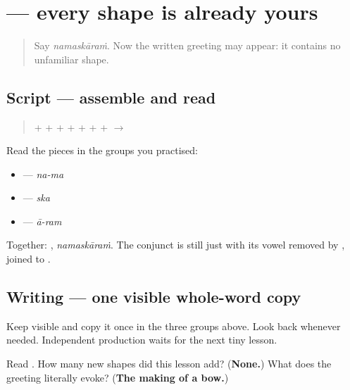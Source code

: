 \section[\texorpdfstring{\ml{നമസ്കാരം} (namaskāraṁ)}{നമസ്കാരം (namaskāraṁ)}]{ — every shape is already yours}

\label{lesson:ML-W01-namaskaram-read}



\begin{quote}
Say \emph{namaskāraṁ}. Now the written greeting may appear: it contains no unfamiliar shape.
\end{quote}

\subsection*{Script — assemble and read}
\begin{quote}
\textbf{} + \textbf{} + \textbf{} + \textbf{} + \textbf{} + \textbf{} + \textbf{} + \textbf{} $\to$ \textbf{}
\end{quote}

Read the pieces in the groups you practised:

\begin{itemize}
\raggedright
  \item \textbf{} — \emph{na-ma}
  \item \textbf{} — \emph{ska}
  \item \textbf{} — \emph{ā-ram}
\end{itemize}

Together: \textbf{}, \emph{namaskāraṁ}. The conjunct \textbf{} is still just \textbf{} with its vowel removed by \textbf{}, joined to \textbf{}.

\subsection*{Writing — one visible whole-word copy}

Keep \textbf{} visible and copy it once in the three groups above. Look back whenever needed. Independent production waits for the next tiny lesson.

\begin{tcolorbox}[breakable,colback=teal!4,colframe=teal!35!black,title={Before you move on}]
Read \textbf{}. How many new shapes did this lesson add? (\textbf{None.}) What does the greeting literally evoke? (\textbf{The making of a bow.})
\end{tcolorbox}

